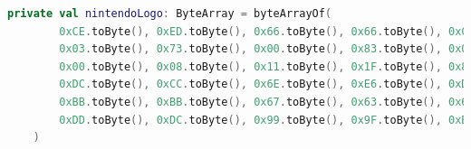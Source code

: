 \begin{lstlisting}[language=Kotlin, caption={Secuencia de arranque y logo de Nintendo}, label={code:kotlinboot}]
    private val nintendoLogo: ByteArray = byteArrayOf(
        0xCE.toByte(), 0xED.toByte(), 0x66.toByte(), 0x66.toByte(), 0xCC.toByte(), 0x0D.toByte(), 0x00.toByte(), 0x0B.toByte(),
        0x03.toByte(), 0x73.toByte(), 0x00.toByte(), 0x83.toByte(), 0x00.toByte(), 0x0C.toByte(), 0x00.toByte(), 0x0D.toByte(),
        0x00.toByte(), 0x08.toByte(), 0x11.toByte(), 0x1F.toByte(), 0x88.toByte(), 0x89.toByte(), 0x00.toByte(), 0x0E.toByte(),
        0xDC.toByte(), 0xCC.toByte(), 0x6E.toByte(), 0xE6.toByte(), 0xDD.toByte(), 0xDD.toByte(), 0xD9.toByte(), 0x99.toByte(),
        0xBB.toByte(), 0xBB.toByte(), 0x67.toByte(), 0x63.toByte(), 0x6E.toByte(), 0x0E.toByte(), 0xEC.toByte(), 0xCC.toByte(),
        0xDD.toByte(), 0xDC.toByte(), 0x99.toByte(), 0x9F.toByte(), 0xBB.toByte(), 0xB9.toByte(), 0x33.toByte(), 0x3E.toByte()
    )


\end{lstlisting}
